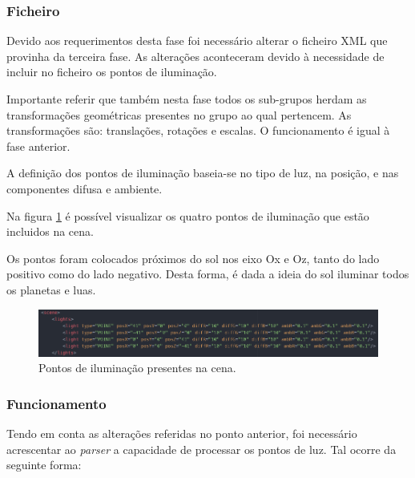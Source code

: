 \documentclass[a4paper]{article}
\begin{document}
\subsubsection{Ficheiro}
\label{sec:ficheiroi}

Devido aos requerimentos desta fase foi necessário alterar o ficheiro XML que provinha da terceira fase. As alterações aconteceram devido à necessidade de incluir no ficheiro os pontos de iluminação.

Importante referir que também nesta fase todos os sub-grupos herdam as transformações geométricas presentes no grupo ao qual pertencem. As transformações são: translações, rotações e escalas. O funcionamento é igual à fase anterior.

A definição dos pontos de iluminação baseia-se no tipo de luz, na posição, e nas componentes difusa e ambiente.

Na figura \ref{img:ficheiro_parser_iluminacao} é possível visualizar os quatro pontos de iluminação que estão incluidos na cena.

Os pontos foram colocados próximos do sol nos eixo Ox e Oz, tanto do lado positivo como do lado negativo. Desta forma, é dada a ideia do sol iluminar todos os planetas e luas.

\begin{figure}[H]
\centering
\includegraphics[scale=0.35]{ficheiro_parser_iluminacao.png}
\caption{Pontos de iluminação presentes na cena.}
\label{img:ficheiro_parser_iluminacao}
\end{figure}

\subsubsection{Funcionamento}
\label{sec:funcionamentoi}

Tendo em conta as alterações referidas no ponto anterior, foi necessário acrescentar ao \textit{parser} a capacidade de processar os pontos de luz. Tal ocorre da seguinte forma:
\end{document}
